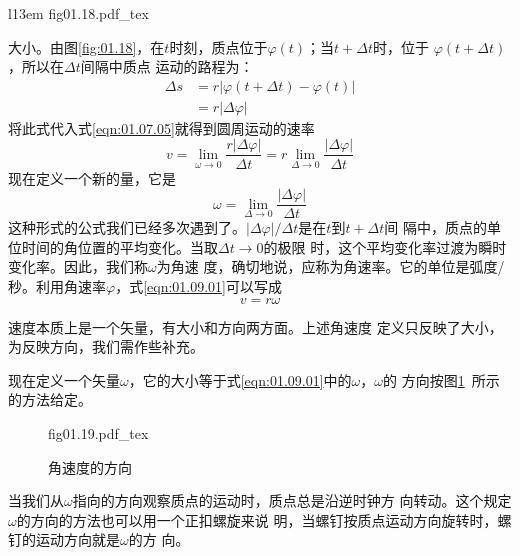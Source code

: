 \begin{wrapfigure}[8]{l}{13em}
    \vspace{-0.5em}
    \centering \small
    {fig01.18.pdf_tex}
    \caption{圆周运动的速率}
    \label{fig:01.18}
\end{wrapfigure}
\noindent 大小。由图\ref{fig:01.18}，在$t$时刻，质点位于$\varphi(t)$；当$t+\Delta t$时，位于
$\varphi(t+\Delta t)$，所以在$\Delta t$间隔中质点
运动的路程为：
\setlength{\mathindent}{2em}
\begin{equation*}
    \begin{aligned}
        \Delta s &=r|\varphi(t+\Delta t)-\varphi(t)| \\
        &=r|\Delta \varphi|
    \end{aligned}
\end{equation*}
将此式代入式\eqref{eqn:01.07.05}就得到圆周运动的速率\vspace{-0.7em}
\setlength{\mathindent}{6em}
\begin{equation}\label{eqn:01.09.01}
    v=\lim _{\omega \rightarrow 0} \frac{r|\Delta \varphi|}{\Delta t}=r \lim _{\Delta \rightarrow 0} \frac{|\Delta \varphi|}{\Delta t}
\end{equation}
现在定义一个新的量，它是
\begin{equation}\label{eqn:01.09.02}
    \omega=\lim _{\Delta \rightarrow 0} \frac{|\Delta \varphi|}{\Delta t}
\end{equation}
这种形式的公式我们已经多次遇到了。$|\Delta\varphi|/\Delta t$是在$t$到$t+\Delta t$间
隔中，质点的单位时间的角位置的平均变化。当取$\Delta t\rightarrow 0$的极限
时，这个平均变化率过渡为瞬时变化率。因此，我们称$\omega$为角速
度，确切地说，应称为角速率。它的单位是弧度/秒。利用角速率$\varphi$，式\eqref{eqn:01.09.01}可以写成
\begin{equation}\label{eqn:01.09.03}
    v=r\omega
\end{equation}

速度本质上是一个矢量，有大小和方向两方面。上述角速度
定义只反映了大小，为反映方向，我们需作些补充。

现在定义一个矢量$\omega$，它的大小等于式\eqref{eqn:01.09.01}中的$\omega$，$\omega$的
方向按图\ref{fig:01.19}~所示的方法给定。
\begin{figure}[!h]
    {fig01.19.pdf_tex}
    \caption{角速度的方向}
    \label{fig:01.19}
    \vspace{-1.2em}
\end{figure}

\noindent 当我们从$\omega$指向的方向观察质点的运动时，质点总是沿逆时钟方
向转动。这个规定$\omega$的方向的方法也可以用一个正扣螺旋来说
明，当螺钉按质点运动方向旋转时，螺钉的运动方向就是$\omega$的方
向。

